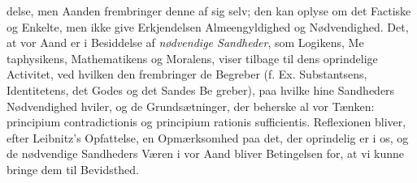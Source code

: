 \documentclass[12pt,a4paper]{book}
\begin{document}
delse, men Aanden frembringer denne af sig selv; den kan
oplyse om det Factiske og Enkelte, men ikke give Erkjendelsen
Almeengyldighed og Nødvendighed. Det, at vor Aand er i
Besiddelse af \emph{nødvendige Sandheder}, som Logikens, Me\-%
taphysikens, Mathematikens og Moralens, viser tilbage til dens
oprindelige Activitet, ved hvilken den frembringer de Begreber
(f. Ex. Substantsens, Identitetens, det Godes og det Sandes Be\-%
greber), paa hvilke hine Sandheders Nødvendighed hviler, og
de Grundsætninger, der beherske al vor Tænken: principium
contradictionis og principium rationis sufficientis. Reflexionen
bliver, efter Leibnitz's Opfattelse, en Opmærksomhed paa det,
der oprindelig er i os, og de nødvendige Sandheders Væren i
vor Aand bliver Betingelsen for, at vi kunne bringe dem til
Bevidsthed.
\end{document}
